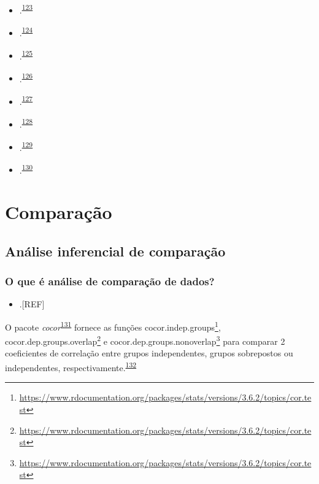 \documentclass[
  a4paper,
]{book}
\providecommand{\tightlist}{%
  \setlength{\itemsep}{0pt}\setlength{\parskip}{0pt}}
\renewcommand{\href}[2]{#2\footnote{\url{#1}}}
\newenvironment{infobox}[1]
  {
  \begin{itemize}
  \renewcommand{\labelitemi}{
    \raisebox{-.7\height}[0pt][0pt]{
      {\setkeys{Gin}{width=3em,keepaspectratio}
        \texttt{[image: \#1]}}
    }
  }
  \setlength{\fboxsep}{1em}
  \begin{blackbox}
  \item
  }
  {
  \end{blackbox}
  \end{itemize}
  }
\begin{document}
\begin{itemize}
\item
  .\textsuperscript{\protect\hyperlink{ref-dwivedi2019}{123}}
\item
  .\textsuperscript{\protect\hyperlink{ref-Dwivedi2022}{124}}
\item
  .\textsuperscript{\protect\hyperlink{ref-Kim2017}{125}}
\item
  .\textsuperscript{\protect\hyperlink{ref-marusteri2010}{126}}
\item
  .\textsuperscript{\protect\hyperlink{ref-mishra2019}{127}}
\item
  .\textsuperscript{\protect\hyperlink{ref-ray2021}{128}}
\item
  .\textsuperscript{\protect\hyperlink{ref-nayak2011}{129}}
\item
  .\textsuperscript{\protect\hyperlink{ref-shankar2014}{130}}
\end{itemize}

\hypertarget{analise-comparacao}{%
\chapter{\texorpdfstring{\textbf{Comparação}}{Comparação}}\label{analise-comparacao}}

\hypertarget{analise-inferencial-comparacao}{%
\section{Análise inferencial de comparação}\label{analise-inferencial-comparacao}}

\hypertarget{o-que-uxe9-anuxe1lise-de-comparauxe7uxe3o-de-dados}{%
\subsection{O que é análise de comparação de dados?}\label{o-que-uxe9-anuxe1lise-de-comparauxe7uxe3o-de-dados}}

\begin{itemize}
\tightlist
\item
  .{[}REF{]}
\end{itemize}

\begin{infobox}{images/Rlogo}
O pacote \emph{cocor}\textsuperscript{\protect\hyperlink{ref-cocor-4}{131}} fornece as funções \href{https://www.rdocumentation.org/packages/stats/versions/3.6.2/topics/cor.test}{cocor.indep.groups}, \href{https://www.rdocumentation.org/packages/stats/versions/3.6.2/topics/cor.test}{cocor.dep.groups.overlap} e \href{https://www.rdocumentation.org/packages/stats/versions/3.6.2/topics/cor.test}{cocor.dep.groups.nonoverlap} para comparar 2 coeficientes de correlação entre grupos independentes, grupos sobrepostos ou independentes, respectivamente.\textsuperscript{\protect\hyperlink{ref-cocor}{132}}

\end{infobox}
\end{document}
